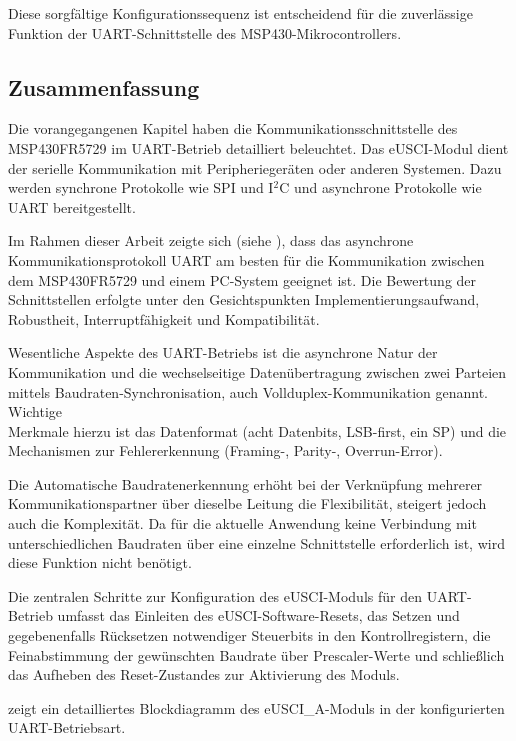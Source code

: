 Diese sorgf\"altige Konfigurationssequenz ist entscheidend f\"ur die zuverl\"assige Funktion der UART-Schnittstelle des MSP430-Mikrocontrollers.

\newpage
\subsection{Zusammenfassung}
\label{sec:eUSCI_Zusammenfassung}

Die vorangegangenen Kapitel haben die Kommunikationsschnittstelle des \\MSP430FR5729 im UART-Betrieb detailliert beleuchtet. Das eUSCI-Modul dient der serielle Kommunikation mit Peripherieger\"aten oder anderen Systemen. Dazu werden synchrone Protokolle wie SPI und I$^{2}$C und asynchrone Protokolle wie UART bereitgestellt.

Im Rahmen dieser Arbeit zeigte sich (siehe ), dass das asynchrone Kommunikationsprotokoll UART am besten f\"ur die Kommunikation zwischen dem MSP430FR5729 und einem PC-System geeignet ist. Die Bewertung der Schnittstellen erfolgte unter den Gesichtspunkten Implementierungsaufwand, Robustheit, Interruptf\"ahigkeit und Kompatibilit\"at.

Wesentliche Aspekte des UART-Betriebs ist die asynchrone Natur der Kommunikation und die wechselseitige Daten\"ubertragung zwischen zwei Parteien mittels Baudraten-Synchronisation, auch Vollduplex-Kommunikation genannt. Wichtige \\Merkmale hierzu ist das Datenformat (\zB acht Datenbits, LSB-first, ein SP) und die Mechanismen zur Fehlererkennung (\zB Framing-, Parity-, Overrun-Error).

Die Automatische Baudratenerkennung erh\"oht bei der Verkn\"upfung mehrerer Kommunikationspartner \"uber dieselbe Leitung die Flexibilit\"at, steigert jedoch auch die Komplexit\"at. Da f\"ur die aktuelle Anwendung keine Verbindung mit unterschiedlichen Baudraten \"uber eine einzelne Schnittstelle erforderlich ist, wird diese Funktion nicht ben\"otigt.

Die zentralen Schritte zur Konfiguration des eUSCI-Moduls f\"ur den UART-Betrieb umfasst das Einleiten des eUSCI-Software-Resets, das Setzen und gegebenenfalls R\"ucksetzen notwendiger Steuerbits in den Kontrollregistern, die Feinabstimmung der gew\"unschten Baudrate \"uber Prescaler-Werte und schlie{\ss}lich das Aufheben des Reset-Zustandes zur Aktivierung des Moduls.

 zeigt ein detailliertes Blockdiagramm des eUSCI\_A-Moduls in der konfigurierten UART-Betriebsart.

